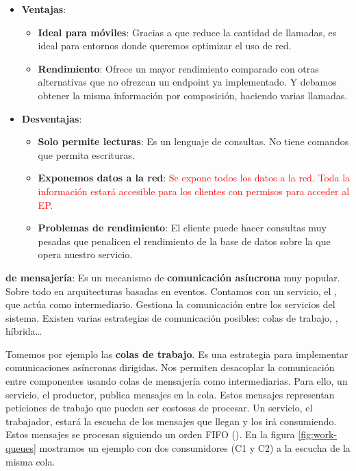 \begin{itemize}
  \item \textbf{Ventajas}:

  \begin{itemize}
    \item \textbf{Ideal para móviles}: Gracias a que reduce la cantidad de llamadas, es ideal para entornos donde queremos optimizar el uso de red.

    \item \textbf{Rendimiento}: Ofrece un mayor rendimiento comparado con otras alternativas que no ofrezcan un endpoint ya implementado. Y debamos obtener la misma información por composición, haciendo varias llamadas.
  \end{itemize}

  \item \textbf{Desventajas}:

  \begin{itemize}
    \item \textbf{Solo permite lecturas}: Es un lenguaje de consultas. No tiene comandos que permita escrituras.

    \item \textbf{Exponemos datos a la red}: \textcolor{red}{Se expone todos los datos a la red. Toda la información estará accesible para los clientes con permisos para acceder al EP.}

    \item \textbf{Problemas de rendimiento}: El cliente puede hacer consultas muy pesadas que penalicen el rendimiento de la base de datos sobre la que opera nuestro servicio.
  \end{itemize}
\end{itemize}

\textbf{ de mensajería}: Es un mecanismo de \textbf{comunicación asíncrona} muy popular. Sobre todo en arquitecturas basadas en eventos. Contamos con un servicio, el , que actúa como intermediario. Gestiona la comunicación entre los servicios del sistema. \cite{newmanBuildingMicroservicesDesigning2021} Existen varias estrategias de comunicación posibles: colas de trabajo, , híbrida\dots

Tomemos por ejemplo las \textbf{colas de trabajo}. \cite{royChapterMessagePatterns2017} Es una estrategia para implementar comunicaciones asíncronas dirigidas. Nos permiten desacoplar la comunicación entre componentes usando colas de mensajería como intermediarias. Para ello, un servicio, el productor, publica mensajes en la cola. Estos mensajes representan peticiones de trabajo que pueden ser costosas de procesar. Un servicio, el trabajador, estará la escucha de los mensajes que llegan y los irá consumiendo. Estos mensajes se procesan siguiendo un orden FIFO (). En la figura \ref{fig:work-queues} mostramos un ejemplo con dos consumidores (C1 y C2) a la escucha de la misma cola.

